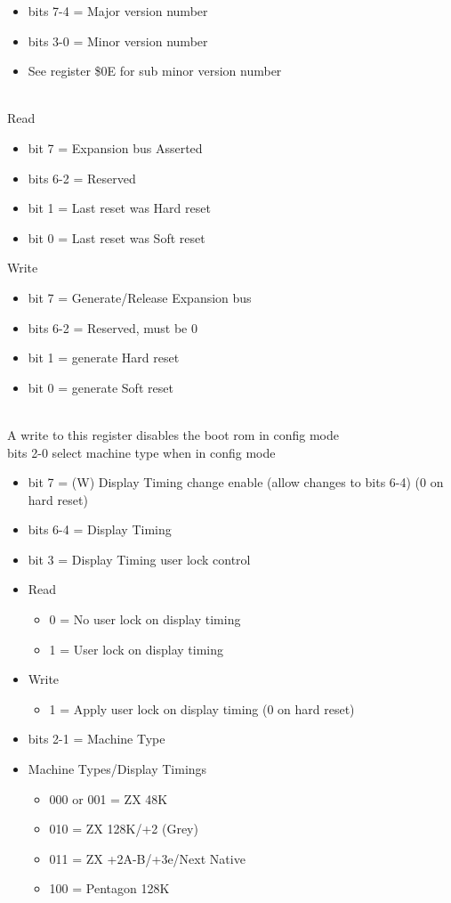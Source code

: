 \begin{itemize}
\item bits 7-4 = Major version number
\item bits 3-0 = Minor version number
\item[] See register \$0E for sub minor version number
\end{itemize}

\\
Read
\begin{itemize}
\item bit 7 = Expansion bus  Asserted
\item bits 6-2 = Reserved
\item bit 1 = Last reset was Hard reset
\item bit 0 = Last reset was Soft reset
\end{itemize}
Write
\begin{itemize}
\item bit 7 = Generate/Release Expansion bus 
\item bits 6-2 = Reserved, must be 0
\item bit 1 = generate Hard reset
\item bit 0 = generate Soft reset
\end{itemize}

\\
A write to this register disables the boot rom in config mode\\
bits 2-0 select machine type when in config mode
\begin{itemize}
\item bit 7 = (W) Display Timing change enable (allow changes to
  bits 6-4) (0 on hard reset)
\item bits 6-4 = Display Timing
\item bit 3 = Display Timing user lock control
  \item[] Read
  \begin{itemize}
  \item 0 = No user lock on display timing
  \item 1 = User lock on display timing
  \end{itemize}
  \item[] Write
  \begin{itemize}
  \item 1 = Apply user lock on display timing (0 on hard reset)
  \end{itemize}
\item bits 2-1 = Machine Type
\item[] Machine Types/Display Timings
  \begin{itemize}
  \item 000 or 001 = ZX 48K
  \item 010 = ZX 128K/+2 (Grey)
  \item 011 = ZX +2A-B/+3e/Next Native
  \item 100 = Pentagon 128K
  \end{itemize}
\end{itemize}


